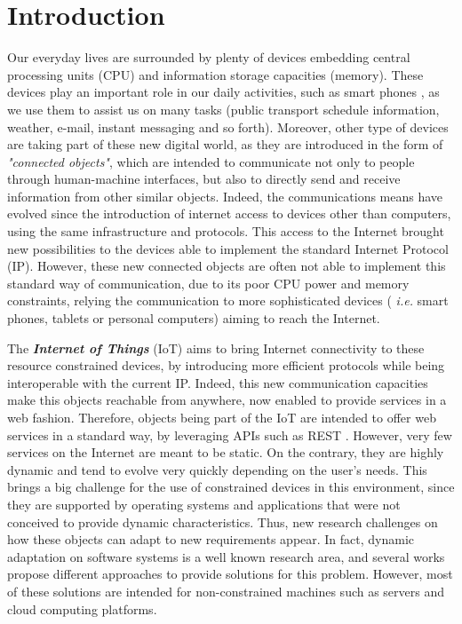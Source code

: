 \chapter{Introduction}
\label{ch:introduction}
Our everyday lives are surrounded by plenty of devices embedding central processing units (CPU) and information storage capacities (memory).
These devices play an important role in our daily activities, such as smart phones \cite{sarwar2013impact}, as we use them to assist us on many tasks (public transport schedule information, weather, e-mail, instant messaging and so forth).
Moreover, other type of devices are taking part of these new digital world, as they are introduced in the form of \textit{"connected objects"}, which are intended to communicate not only to people through human-machine interfaces, but also to directly send and receive information from other similar objects.
Indeed, the communications means have evolved since the introduction of internet access to devices other than computers, using the same infrastructure and protocols.
This access to the Internet brought new possibilities to the devices able to implement the standard Internet Protocol (IP).
However, these new connected objects are often not able to implement this standard way of communication, due to its poor CPU power and memory constraints, relying the communication to more sophisticated devices ( \textit{i.e.} smart phones, tablets or personal computers) aiming to reach the Internet.

The \textbf{\textit{Internet of Things}} (IoT) aims to bring Internet connectivity to these resource constrained devices, by introducing more efficient protocols while being interoperable with the current IP.
Indeed, this new communication capacities make this objects reachable from anywhere, now enabled to provide services in a web fashion.
Therefore, objects being part of the IoT are intended to offer web services in a standard way, by leveraging APIs such as REST \cite{Fielding02REST}.
However, very few services on the Internet are meant to be static.
On the contrary, they are highly dynamic and tend to evolve very quickly depending on the user's needs.
This brings a big challenge for the use of constrained devices in this environment, since they are supported by operating systems and applications that were not conceived to provide dynamic characteristics.
Thus, new research challenges on how these objects can adapt to new requirements appear.
In fact, dynamic adaptation on software systems is a well known research area, and several works propose different approaches to provide solutions for this problem.
However, most of these solutions are intended for non-constrained machines such as servers and cloud computing platforms.

